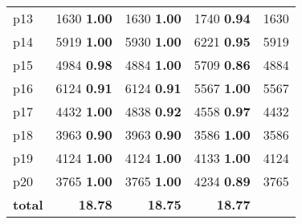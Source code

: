 \begin{tabular}{lrrrr}
\multicolumn{1}{l|}{p13} & {\footnotesize 1630} \textbf{1.00} & {\footnotesize 1630} \textbf{1.00} & {\footnotesize 1740} \textbf{0.94} & \multicolumn{1}{|r}{1630}\\
\multicolumn{1}{l|}{p14} & {\footnotesize 5919} \textbf{1.00} & {\footnotesize 5930} \textbf{1.00} & {\footnotesize 6221} \textbf{0.95} & \multicolumn{1}{|r}{5919}\\
\multicolumn{1}{l|}{p15} & {\footnotesize 4984} \textbf{0.98} & {\footnotesize 4884} \textbf{1.00} & {\footnotesize 5709} \textbf{0.86} & \multicolumn{1}{|r}{4884}\\
\multicolumn{1}{l|}{p16} & {\footnotesize 6124} \textbf{0.91} & {\footnotesize 6124} \textbf{0.91} & {\footnotesize 5567} \textbf{1.00} & \multicolumn{1}{|r}{5567}\\
\multicolumn{1}{l|}{p17} & {\footnotesize 4432} \textbf{1.00} & {\footnotesize 4838} \textbf{0.92} & {\footnotesize 4558} \textbf{0.97} & \multicolumn{1}{|r}{4432}\\
\multicolumn{1}{l|}{p18} & {\footnotesize 3963} \textbf{0.90} & {\footnotesize 3963} \textbf{0.90} & {\footnotesize 3586} \textbf{1.00} & \multicolumn{1}{|r}{3586}\\
\multicolumn{1}{l|}{p19} & {\footnotesize 4124} \textbf{1.00} & {\footnotesize 4124} \textbf{1.00} & {\footnotesize 4133} \textbf{1.00} & \multicolumn{1}{|r}{4124}\\
\multicolumn{1}{l|}{p20} & {\footnotesize 3765} \textbf{1.00} & {\footnotesize 3765} \textbf{1.00} & {\footnotesize 4234} \textbf{0.89} & \multicolumn{1}{|r}{3765}\\
\midrule
\textbf{total} & \textbf{18.78} & \textbf{18.75} & \textbf{18.77} & \\
\bottomrule
\end{tabular}

